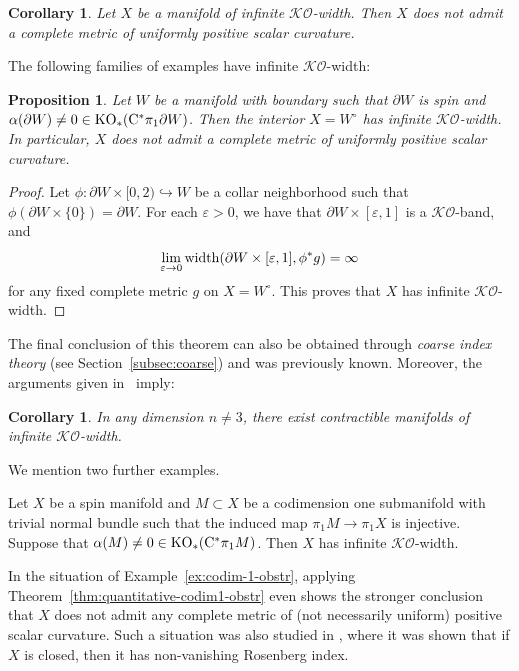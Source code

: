 \documentclass[pdftex]{sigma}
\numberwithin{equation}{section}
\newtheorem{Corollary}[Theorem]{Corollary}
\newtheorem{Proposition}[Theorem]{Proposition}
\begin{document}
\begin{Corollary}\label{cor:KO-width-obstr}
 Let \(X\) be a manifold of infinite \(\mathcal{KO}\)-width.
 Then \(X\) does not admit a complete metric of uniformly positive scalar curvature.
\end{Corollary}

The following families of examples have infinite \(\mathcal{KO}\)-width:
\begin{Proposition}\label{prop:boundary-obstr}
 Let \(W\) be a manifold with boundary such that \(\partial W\) is spin and \(\alpha(\partial W) \neq 0 \in \operatorname{KO}_\ast(\mathrm{C}^\ast \pi_1 \partial W)\).
 Then the interior \(X = W^\circ\) has infinite \(\mathcal{KO}\)-width.
 In particular, \(X\) does not admit a complete metric of uniformly positive scalar curvature.
\end{Proposition}
\begin{proof}
 Let \(\phi \colon \partial W \times [0,2) \hookrightarrow W\) be a collar neighborhood such that \(\phi(\partial W \times \{0\}) = \partial W\).
 For each \(\varepsilon >0\), we have that \(\partial W \times [\varepsilon, 1]\) is a \(\mathcal{KO}\)-band, and
 \[
 \lim_{\varepsilon \to 0} \operatorname{width}(\partial W \times [\varepsilon, 1], \phi^\ast g) = \infty
 \]
 for any fixed complete metric \(g\) on \(X = W^\circ\).
 This proves that \(X\) has infinite \(\mathcal{KO}\)-width.
\end{proof}
The final conclusion of this theorem can also be obtained through \emph{coarse index theory} (see Section~\ref{subsec:coarse}) and was previously known.
Moreover, the arguments given in~\cite[Theorem~3.2]{ChangWeinbergerYu:Taming3} imply:
\begin{Corollary}
 In any dimension \(n \neq 3\), there exist contractible manifolds of infinite \(\mathcal{KO}\)-width.
\end{Corollary}

We mention two further examples.

\begin{Example} \label{ex:codim-1-obstr}
 Let \(X\) be a spin manifold and \(M \subset X\) be a codimension one submanifold with trivial normal bundle such that the induced map \(\pi_1 M \to \pi_1 X\) is injective.
 Suppose that \(\alpha(M) \neq 0 \in \operatorname{KO}_\ast(\mathrm{C}^\ast \pi_1 M)\).
 Then \(X\) has infinite \(\mathcal{KO}\)-width.
\end{Example}

In the situation of Example~\ref{ex:codim-1-obstr}, applying Theorem~\ref{thm:quantitative-codim1-obstr} even shows the stronger conclusion that \(X\) does not admit any complete metric of (not necessarily uniform) positive scalar curvature.
Such a situation was also studied in \cite{NitscheSchickZeidler:Transfer,Zeidler:IndexObstructionPositive}, where it was shown that if \(X\) is closed, then it has non-vanishing Rosenberg index.
\end{document}
